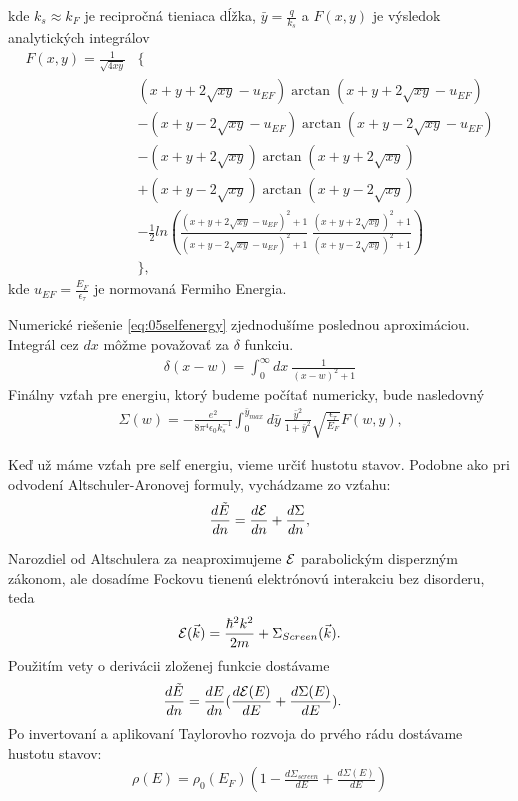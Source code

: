 kde $k_s\approx k_F$ je recipročná tieniaca dĺžka, $\bar{y}=\frac{q}{k_s}$  a $F(x,y)$ je výsledok analytických integrálov
\begin{align*}
F(x,y)=\frac{1}{\sqrt{4xy}}&\{ \\
&(x+y+2\sqrt{xy}-u_{EF})\arctan(x+y+2\sqrt{xy}-u_{EF}) \\
&-(x+y-2\sqrt{xy}-u_{EF})\arctan(x+y-2\sqrt{xy}-u_{EF}) \\
&-(x+y+2\sqrt{xy})\arctan(x+y+2\sqrt{xy}) \\
&+(x+y-2\sqrt{xy})\arctan(x+y-2\sqrt{xy}) \\
&-\frac{1}{2}ln(\frac{(x+y+2\sqrt{xy}-u_{EF})^2+1}{(x+y-2\sqrt{xy}-u_{EF})^2+1}\ \frac{(x+y+2\sqrt{xy})^2+1}{(x+y-2\sqrt{xy})^2+1})\\
&\}\text{,}
\end{align*}
kde $u_{EF}=\frac{E_F}{\epsilon_\tau}$ je normovaná Fermiho Energia.

Numerické riešenie \eqref{eq:05selfenergy} zjednodušíme poslednou aproximáciou. Integrál cez $dx$ môžme považovať za $\delta$ funkciu.
\begin{align}
\delta(x-w)=\int_0^{\infty}dx\ \frac{1}{(x-w)^2+1}
\end{align}
Finálny vzťah pre energiu, ktorý budeme počítať numericky, bude nasledovný
\begin{align}
\label{eq:05selfenergy2}
\Sigma(w)=-\frac{e^2}{8\pi^4\epsilon_0 k_s^{-1}} \int_0^{\bar y_{max}} d\bar{y}\ \frac{\bar{y}^2}{1+\bar{y}^2}\sqrt{\frac{\epsilon_\tau}{E_F}}F(w,y) \text{,}
\end{align} 

Keď už máme vzťah pre self energiu, vieme určiť hustotu stavov. Podobne ako pri odvodení Altschuler-Aronovej formuly, vychádzame zo vzťahu:
\begin{align}
\frac{d\tilde{E}}{dn}=\frac{d\mathcal{E}}{dn} + \frac{d\Sigma}{dn} \text{,}
\end{align}

Narozdiel od Altschulera za neaproximujeme $\mathcal{E}$ parabolickým disperzným zákonom, ale dosadíme Fockovu tienenú elektrónovú interakciu bez disorderu, teda
\begin{align}
\mathcal{E}(\vec{k})=\frac{\hbar^2k^2}{2m}+\Sigma_{Screen}(\vec{k})\text{.}
\end{align}
 Použitím vety o derivácii zloženej funkcie dostávame
\begin{align}
\frac{d\tilde{E}}{dn}&=\frac{dE}{dn}(\frac{d\mathcal{E}(E)}{dE}+\frac{d\Sigma(E)}{dE}) \text{.} 
\end{align}
Po invertovaní a aplikovaní Taylorovho rozvoja do prvého rádu dostávame hustotu stavov:
\begin{align}
\label{eq:05rho_final}
\rho(E) = \rho_0(E_F)(1-\frac{d\Sigma_{screen}}{dE}+\frac{d\Sigma(E)}{dE})
\end{align}

 

